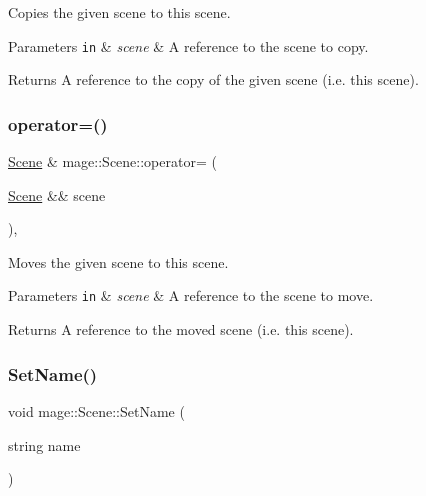 Copies the given scene to this scene.


\begin{DoxyParams}[1]{Parameters}
\mbox{\tt in}  & {\em scene} & A reference to the scene to copy. \\
\hline
\end{DoxyParams}
\begin{DoxyReturn}{Returns}
A reference to the copy of the given scene (i.\+e. this scene). 
\end{DoxyReturn}
\hypertarget{classmage_1_1_scene_a0256a5b54db093088f40511cf61eb277}{}\label{classmage_1_1_scene_a0256a5b54db093088f40511cf61eb277} 
\subsubsection{\texorpdfstring{operator=()}{operator=()}\hspace{0.1cm}{\footnotesize\ttfamily [2/2]}}
{\footnotesize\ttfamily \hyperlink{classmage_1_1_scene}{Scene} \& mage\+::\+Scene\+::operator= (\begin{DoxyParamCaption}\item[{\hyperlink{classmage_1_1_scene}{Scene} \&\&}]{scene }\end{DoxyParamCaption})\hspace{0.3cm}{\ttfamily [default]}, {\ttfamily [noexcept]}}

Moves the given scene to this scene.


\begin{DoxyParams}[1]{Parameters}
\mbox{\tt in}  & {\em scene} & A reference to the scene to move. \\
\hline
\end{DoxyParams}
\begin{DoxyReturn}{Returns}
A reference to the moved scene (i.\+e. this scene). 
\end{DoxyReturn}
\hypertarget{classmage_1_1_scene_ae5e0a4daa62322ff18d673944ad4e0e8}{}\label{classmage_1_1_scene_ae5e0a4daa62322ff18d673944ad4e0e8} 
\subsubsection{\texorpdfstring{Set\+Name()}{SetName()}}
{\footnotesize\ttfamily void mage\+::\+Scene\+::\+Set\+Name (\begin{DoxyParamCaption}\item[{string}]{name }\end{DoxyParamCaption})\hspace{0.3cm}{\ttfamily [noexcept]}}

